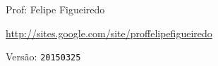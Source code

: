 \documentclass[a4paper]{article}
\begin{document}
\parbox[c]{.825\textwidth}{\raggedright%
{Prof: Felipe Figueiredo\par}
{\url{http://sites.google.com/site/proffelipefigueiredo}\par}
}

Versão: \verb|20150325|



\section{}


\section{}
\end{document}
